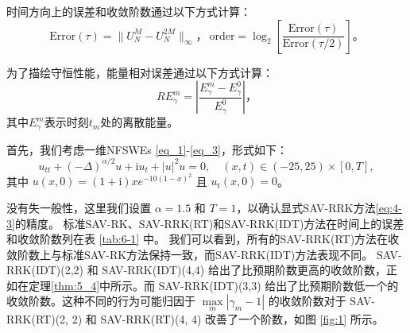 	时间方向上的误差和收敛阶数通过以下方式计算：
	\begin{equation}
		\text{Error}(\tau) = \|U_{N}^{M} - U_{N}^{2 M}\|_{\infty}，~\text{order} = \log_{2}\left[\frac{\text{Error}(\tau)}{\text{Error}(\tau / 2)}\right]。\label{eq_104}
	\end{equation}
	
	为了描绘守恒性能，能量相对误差通过以下方式计算：
	\begin{equation}\label{eq_105}
		R E_{\gamma}^{m} = \left|\frac{E_{\gamma}^{m} - E_{\gamma}^{0}}{E_{\gamma}^{0}}\right|，
	\end{equation}
	其中$E_{\gamma}^{m}$表示时刻$t_m$处的离散能量。

	\begin{example}\label{ex:1}
		首先，我们考虑一维NFSWEs \eqref{eq_1}-\eqref{eq_3}，形式如下：
		\begin{equation}\label{eq_108}
			u_{t t}+(-\Delta)^{\alpha / 2} u+\mathrm{i}u_t+|u|^2 u=0, \quad (x,t)\in  (-25, 25)\times[0, T],
		\end{equation}
		其中 $u(x, 0)=(1+\mathrm{i}) x e^{-10(1-x)^2}$ 且 $u_t(x, 0)=0$。
		\end{example}
			
		
			
		没有失一般性，这里我们设置 $\alpha=1.5$ 和 $T=1$，以确认显式SAV-RRK方法\eqref{eq:4-3}的精度。
		标准SAV-RK、SAV-RRK(RT)和SAV-RRK(IDT)方法在时间上的误差和收敛阶数列在表 \ref{tab:6-1} 中。
		我们可以看到，所有的SAV-RRK(RT)方法在收敛阶数上与标准SAV-RK方法保持一致，而SAV-RRK(IDT)方法表现不同。
		SAV-RRK(IDT)(2,2) 和 SAV-RRK(IDT)(4,4) 给出了比预期阶数更高的收敛阶数，正如在定理\ref{thm:5_4}中所示。而 SAV-RRK(IDT)(3,3) 给出了比预期阶数低一个的收敛阶数。这种不同的行为可能归因于 $\max\limits _m\left|\gamma_m-1\right|$ 的收敛阶数对于 SAV-RRK(RT)(2, 2) 和 SAV-RRK(RT)(4, 4) 改善了一个阶数，如图 \ref{fig:1} 所示。

